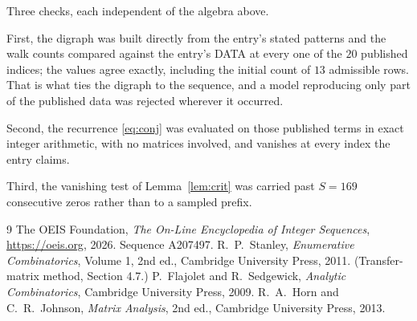 \documentclass[11pt,a4paper]{article}
\theoremstyle{plain}
\theoremstyle{definition}
\begin{document}
Three checks, each independent of the algebra above.

First, the digraph was built directly from the entry's stated patterns and the walk counts
compared against the entry's DATA at every one of the $20$ published indices; the
values agree exactly, including the initial count of $13$ admissible rows. That is
what ties the digraph to the sequence, and a model reproducing only part of the published
data was rejected wherever it occurred.

Second, the recurrence \eqref{eq:conj} was evaluated on those published terms in exact
integer arithmetic, with no matrices involved, and vanishes at every index the entry claims.

Third, the vanishing test of Lemma~\ref{lem:crit} was carried past $S=169$ consecutive
zeros rather than to a sampled prefix.

\begin{thebibliography}{9}
 The OEIS Foundation, \emph{The On-Line Encyclopedia of Integer
Sequences}, \url{https://oeis.org}, 2026. Sequence A207497.
 R.~P.~Stanley, \emph{Enumerative Combinatorics}, Volume 1, 2nd ed.,
Cambridge University Press, 2011. (Transfer-matrix method, Section 4.7.)
 P.~Flajolet and R.~Sedgewick, \emph{Analytic Combinatorics}, Cambridge
University Press, 2009.
 R.~A.~Horn and C.~R.~Johnson, \emph{Matrix Analysis}, 2nd ed., Cambridge
University Press, 2013.
\end{thebibliography}
\end{document}
